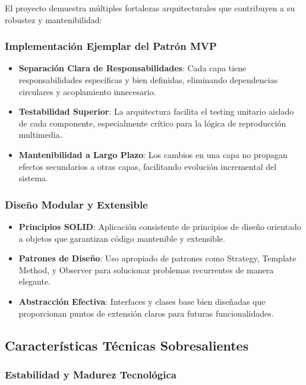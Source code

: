 \documentclass[a4paper]{article}
\begin{document}
El proyecto demuestra múltiples fortalezas arquitecturales que contribuyen a su robustez y mantenibilidad:

\subsubsection{Implementación Ejemplar del Patrón MVP}

\begin{itemize}
\item \textbf{Separación Clara de Responsabilidades}: Cada capa tiene responsabilidades específicas y bien definidas, eliminando dependencias circulares y acoplamiento innecesario.

\item \textbf{Testabilidad Superior}: La arquitectura facilita el testing unitario aislado de cada componente, especialmente crítico para la lógica de reproducción multimedia.

\item \textbf{Mantenibilidad a Largo Plazo}: Los cambios en una capa no propagan efectos secundarios a otras capas, facilitando evolución incremental del sistema.
\end{itemize}

\subsubsection{Diseño Modular y Extensible}

\begin{itemize}
\item \textbf{Principios SOLID}: Aplicación consistente de principios de diseño orientado a objetos que garantizan código mantenible y extensible.

\item \textbf{Patrones de Diseño}: Uso apropiado de patrones como Strategy, Template Method, y Observer para solucionar problemas recurrentes de manera elegante.

\item \textbf{Abstracción Efectiva}: Interfaces y clases base bien diseñadas que proporcionan puntos de extensión claros para futuras funcionalidades.
\end{itemize}

\subsection{Características Técnicas Sobresalientes}

\subsubsection{Estabilidad y Madurez Tecnológica}
\end{document}
